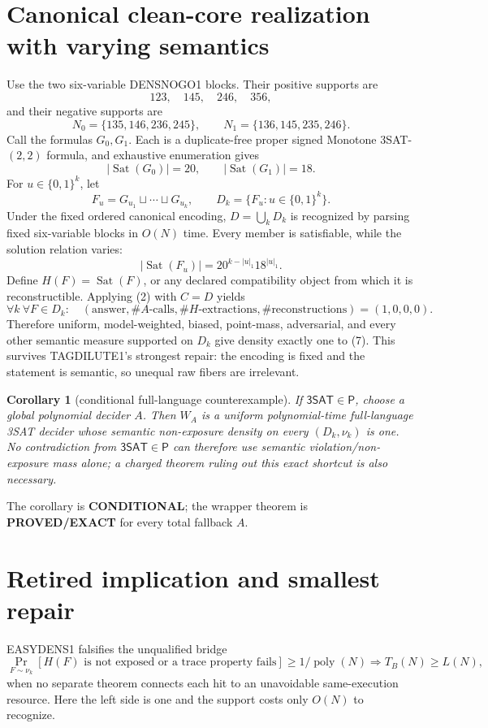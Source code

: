 \documentclass[11pt]{article}
\newtheorem{corollary}{Corollary}
\newcommand{\EXACT}{\textbf{PROVED/EXACT}}
\newcommand{\COND}{\textbf{CONDITIONAL}}
\begin{document}
\section{Canonical clean-core realization with varying semantics}
Use the two six-variable DENSNOGO1 blocks. Their positive supports are
\[
123,\quad145,\quad246,\quad356,
\]
and their negative supports are
\[
N_0=\{135,146,236,245\},\qquad
N_1=\{136,145,235,246\}.
\]
Call the formulas \(G_0,G_1\). Each is a duplicate-free proper signed
Monotone \(3\)SAT-\((2,2)\) formula, and exhaustive enumeration gives
\[
 |\operatorname{Sat}(G_0)|=20,\qquad
 |\operatorname{Sat}(G_1)|=18.                           \tag{4}
\]
For \(u\in\{0,1\}^k\), let
\[
 F_u=G_{u_1}\sqcup\cdots\sqcup G_{u_k},\qquad
 D_k=\{F_u:u\in\{0,1\}^k\}.                             \tag{5}
\]
Under the fixed ordered canonical encoding, \(D=\bigcup_kD_k\) is recognized
by parsing fixed six-variable blocks in \(O(N)\) time. Every member is
satisfiable, while the solution relation varies:
\[
 |\operatorname{Sat}(F_u)|=20^{k-|u|_1}18^{|u|_1}.       \tag{6}
\]
Define \(H(F)=\operatorname{Sat}(F)\), or any declared compatibility object
from which it is reconstructible. Applying (2) with \(C=D\) yields
\[
 \forall k\ \forall F\in D_k:\quad
 (\mathrm{answer},\#A\text{-calls},\#H\text{-extractions},
 \#\text{reconstructions})=(1,0,0,0).                    \tag{7}
\]
Therefore uniform, model-weighted, biased, point-mass, adversarial, and every
other semantic measure supported on \(D_k\) give density exactly one to (7).
This survives TAGDILUTE1's strongest repair: the encoding is fixed and the
statement is semantic, so unequal raw fibers are irrelevant.

\begin{corollary}[conditional full-language counterexample]
If \(\mathsf{3SAT}\in\mathsf P\), choose a global polynomial decider \(A\).
Then \(W_A\) is a uniform polynomial-time full-language 3SAT decider whose
semantic non-exposure density on every \((D_k,\nu_k)\) is one. No
contradiction from \(\mathsf{3SAT}\in\mathsf P\) can therefore use semantic
violation/non-exposure mass alone; a charged theorem ruling out this exact
shortcut is also necessary.
\end{corollary}
The corollary is \COND{}; the wrapper theorem is \EXACT{} for every total
fallback \(A\).

\section{Retired implication and smallest repair}
EASYDENS1 falsifies the unqualified bridge
\[
 \Pr_{F\sim\nu_k}[\text{\(H(F)\) is not exposed or a trace property fails}]
 \ge 1/\operatorname{poly}(N)
 \Longrightarrow T_B(N)\ge L(N),                         \tag{8}
\]
when no separate theorem connects each hit to an unavoidable same-execution
resource. Here the left side is one and the support costs only \(O(N)\) to
recognize.
\end{document}
